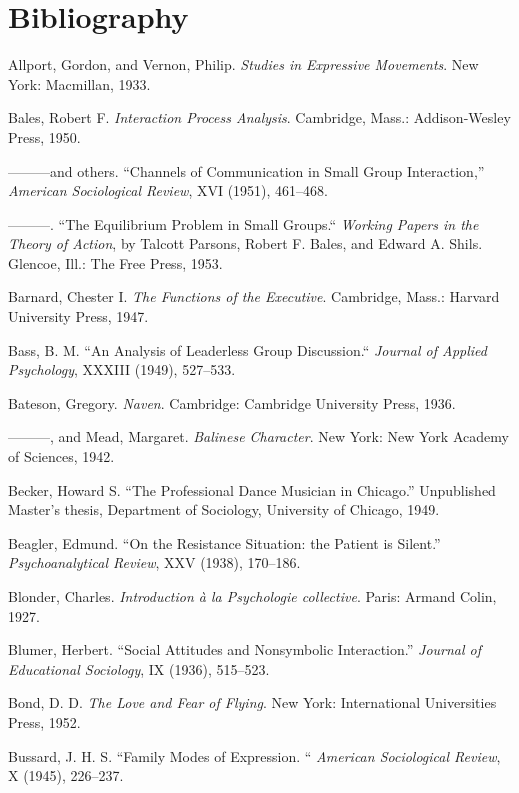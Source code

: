 \documentclass[twoside,symmetric,nobib,justified]{tufte-book}
\let\oldchapter\chapter
\def\chapter{%
  \setcounter{footnote}{0}%
  \oldchapter
}
\begin{document}
\chapter[BIBLIOGRAPHY]{Bibliography}
\label{ch:Bibliography}

\begin{hangparas}{.25in}{1} 

Allport, Gordon, and Vernon, Philip. \emph{Studies in Expressive
Movements}. New York: Macmillan, 1933.

Bales, Robert F. \emph{Interaction Process Analysis}. Cambridge, Mass.:
Addison-Wesley Press, 1950.

---------and others. ``Channels of Communication in Small Group
Interaction,'' \emph{American Sociological Review}, XVI (1951),
461--468.

---------. ``The Equilibrium Problem in Small Groups.`` \emph{Working
Papers in the Theory of Action}, by Talcott Parsons, Robert F. Bales,
and Edward A. Shils. Glencoe, Ill.: The Free Press, 1953.

Barnard, Chester I. \emph{The Functions of the Executive}. Cambridge,
Mass.: Harvard University Press, 1947.

Bass, B. M. ``An Analysis of Leaderless Group Discussion.``
\emph{Journal of Applied Psychology}, XXXIII (1949), 527--533.

Bateson, Gregory. \emph{Naven}. Cambridge: Cambridge University Press,
1936.

---------, and Mead, Margaret. \emph{Balinese Character}. New York: New
York Academy of Sciences, 1942.

Becker, Howard S. ``The Professional Dance Musician in Chicago.''
Unpublished Master's thesis, Department of Sociology, University of
Chicago, 1949.

Beagler, Edmund. ``On the Resistance Situation: the Patient is Silent.''
\emph{Psychoanalytical Review}, XXV (1938), 170--186.

Blonder, Charles. \emph{Introduction à la Psychologie collective}.
Paris: Armand Colin, 1927.

Blumer, Herbert. ``Social Attitudes and Nonsymbolic Interaction.''
\emph{Journal of Educational Sociology}, IX (1936), 515--523.

Bond, D. D. \emph{The Love and Fear of Flying}. New York: International
Universities Press, 1952.

Bussard, J. H. S. ``Family Modes of Expression. `` \emph{American
Sociological Review}, X (1945), 226--237.


\end{hangparas}
\end{document}
